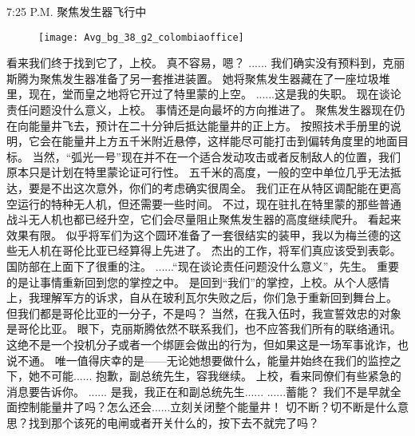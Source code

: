 \documentclass[openany]{book}
\begin{document}
7:25 P.M. 聚焦发生器飞行中
\begin{figure}[h]
    \centering
    \texttt{[image: Avg\_bg\_38\_g2\_colombiaoffice]}
\end{figure}
\begin{dialogue}
     看来我们终于找到它了，上校。
     真不容易，嗯？
     ......
     我们确实没有预料到，克丽斯腾为聚焦发生器准备了另一套推进装置。
     她将聚焦发生器藏在了一座垃圾堆里，现在，堂而皇之地将它开过了特里蒙的上空。
     ......这是我的失职。
     现在谈论责任问题没什么意义，上校。
     事情还是向最坏的方向推进了。
     聚焦发生器现在仍在向能量井飞去，预计在二十分钟后抵达能量井的正上方。
     按照技术手册里的说明，它会在能量井上方五千米附近悬停，这样能尽可能打击到偏转角度里的地面目标。
     当然，“弧光一号”现在并不在一个适合发动攻击或者反制敌人的位置，我们原本只是计划在特里蒙论证可行性。
     五千米的高度，一般的空中单位几乎无法抵达，要是不出这次意外，你们的考虑确实很周全。
     我们正在从特区调配能在更高空运行的特种无人机，但还需要一些时间。
     不过，现在驻扎在特里蒙的那些普通战斗无人机也都已经升空，它们会尽量阻止聚焦发生器的高度继续爬升。
     看起来效果有限。
     似乎将军们为这个圆环准备了一套很结实的装甲，我以为梅兰德的这些无人机在哥伦比亚已经算得上先进了。
     杰出的工作，将军们真应该受到表彰。
     国防部在上面下了很重的注。
     ......“现在谈论责任问题没什么意义”，先生。
     重要的是让事情重新回到您的掌控之中。
     是回到“我们”的掌控，上校。从个人感情上，我理解军方的诉求，自从在玻利瓦尔失败之后，你们急于重新回到舞台上。
     但我们都是哥伦比亚的一分子，不是吗？
     当然，在我入伍时，我宣誓效忠的对象是哥伦比亚。
     眼下，克丽斯腾依然不联系我们，也不应答我们所有的联络通讯。
     这绝不是一个投机分子或者一个绑匪会做出的行为，但如果这是一场军事讹诈，也说不通。
     唯一值得庆幸的是——无论她想要做什么，能量井始终在我们的监控之下，她不可能......
     抱歉，副总统先生，容我继续。
     上校，看来同僚们有些紧急的消息要告诉你。
     ......
     是我，我正在和副总统先生......
     ......蓄能？
     我们不是早就全面控制能量井了吗？怎么还会......立刻关闭整个能量井！
     切不断？切不断是什么意思？找到那个该死的电闸或者开关什么的，按下去不就完了吗？

\end{dialogue}
\end{document}

